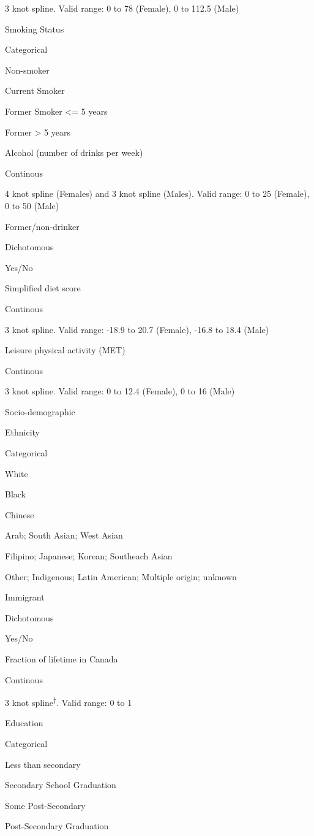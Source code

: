 \documentclass[]{book}
\begin{document}
3 knot spline. Valid range: 0 to 78 (Female), 0 to 112.5 (Male)

Smoking Status

Categorical

Non-smoker

Current Smoker

Former Smoker \textless{}= 5 years

Former \textgreater{} 5 years

Alcohol (number of drinks per week)

Continous

4 knot spline (Females) and 3 knot spline (Males). Valid range: 0 to 25
(Female), 0 to 50 (Male)

Former/non-drinker

Dichotomous

Yes/No

Simplified diet score

Continous

3 knot spline. Valid range: -18.9 to 20.7 (Female), -16.8 to 18.4 (Male)

Leisure physical activity (MET)

Continous

3 knot spline. Valid range: 0 to 12.4 (Female), 0 to 16 (Male)

Socio-demographic

Ethnicity

Categorical

White

Black

Chinese

Arab; South Asian; West Asian

Filipino; Japanese; Korean; Southeach Asian

Other; Indigenous; Latin American; Multiple origin; unknown

Immigrant

Dichotomous

Yes/No

Fraction of lifetime in Canada

Continous

3 knot spline\textsuperscript{†}. Valid range: 0 to 1

Education

Categorical

Less than secondary

Secondary School Graduation

Some Post-Secondary

Post-Secondary Graduation
\end{document}
